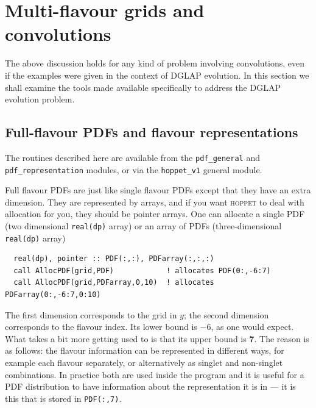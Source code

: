 \documentclass[12pt]{article}
\newcommand{\hoppet}{\textsc{hoppet}\xspace}
\newcommand{\ttt}[1]{\texttt{#1}}
\begin{document}
\section{Multi-flavour grids and convolutions}
\label{sec:dglapstructs}

The above discussion holds for any kind of problem involving
convolutions, even if the examples were given in the context of DGLAP
evolution. In this section we shall examine the tools made available
specifically to address the DGLAP evolution problem.


\subsection{Full-flavour PDFs and flavour representations}
\label{sec:pdf-objects}

The routines described here are available from the \ttt{pdf\_general}
and \ttt{pdf\_representation} modules, or via the \ttt{hoppet\_v1}
general module.

Full flavour PDFs are just like single flavour PDFs except that they
have an extra dimension. They are represented by arrays, and if you
want \hoppet to deal with allocation for you, they should be pointer
arrays. One can allocate a single PDF (two dimensional
\texttt{real(dp)} array) or an array of PDFs (three-dimensional
\texttt{real(dp)} array)
\begin{verbatim}
  real(dp), pointer :: PDF(:,:), PDFarray(:,:,:)
  call AllocPDF(grid,PDF)            ! allocates PDF(0:,-6:7)
  call AllocPDF(grid,PDFarray,0,10)  ! allocates PDFarray(0:,-6:7,0:10)
\end{verbatim}
The first dimension corresponds to the grid in $y$; the second
dimension corresponds to the flavour index. Its lower bound is $-6$,
as one would expect. What takes a bit more getting used to is that its
upper bound is \textbf{7}. The reason is as follows: the flavour
information can be represented in different ways, for example each
flavour separately, or alternatively as singlet and non-singlet
combinations. In practice both are used inside the program and it is
useful for a PDF distribution to have information about the
representation it is in --- it is this that is stored in
\texttt{PDF(:,7)}.

\end{document}
